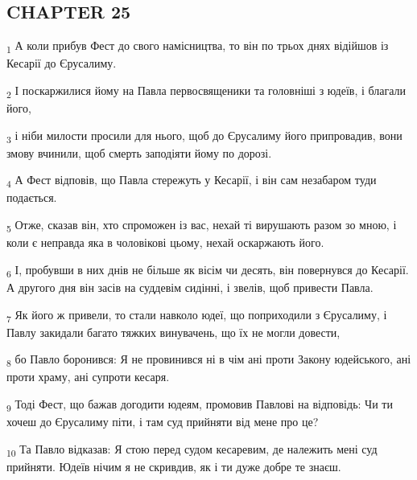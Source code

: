 \subsection{CHAPTER 25}
\begin{tcolorbox}
\textsubscript{1} А коли прибув Фест до свого намісництва, то він по трьох днях відійшов із Кесарії до Єрусалиму.
\end{tcolorbox}
\begin{tcolorbox}
\textsubscript{2} І поскаржилися йому на Павла первосвященики та головніші з юдеїв, і благали його,
\end{tcolorbox}
\begin{tcolorbox}
\textsubscript{3} і ніби милости просили для нього, щоб до Єрусалиму його припровадив, вони змову вчинили, щоб смерть заподіяти йому по дорозі.
\end{tcolorbox}
\begin{tcolorbox}
\textsubscript{4} А Фест відповів, що Павла стережуть у Кесарії, і він сам незабаром туди подається.
\end{tcolorbox}
\begin{tcolorbox}
\textsubscript{5} Отже, сказав він, хто спроможен із вас, нехай ті вирушають разом зо мною, і коли є неправда яка в чоловікові цьому, нехай оскаржають його.
\end{tcolorbox}
\begin{tcolorbox}
\textsubscript{6} І, пробувши в них днів не більше як вісім чи десять, він повернувся до Кесарії. А другого дня він засів на суддевім сидінні, і звелів, щоб привести Павла.
\end{tcolorbox}
\begin{tcolorbox}
\textsubscript{7} Як його ж привели, то стали навколо юдеї, що поприходили з Єрусалиму, і Павлу закидали багато тяжких винувачень, що їх не могли довести,
\end{tcolorbox}
\begin{tcolorbox}
\textsubscript{8} бо Павло боронився: Я не провинився ні в чім ані проти Закону юдейського, ані проти храму, ані супроти кесаря.
\end{tcolorbox}
\begin{tcolorbox}
\textsubscript{9} Тоді Фест, що бажав догодити юдеям, промовив Павлові на відповідь: Чи ти хочеш до Єрусалиму піти, і там суд прийняти від мене про це?
\end{tcolorbox}
\begin{tcolorbox}
\textsubscript{10} Та Павло відказав: Я стою перед судом кесаревим, де належить мені суд прийняти. Юдеїв нічим я не скривдив, як і ти дуже добре те знаєш.
\end{tcolorbox}
